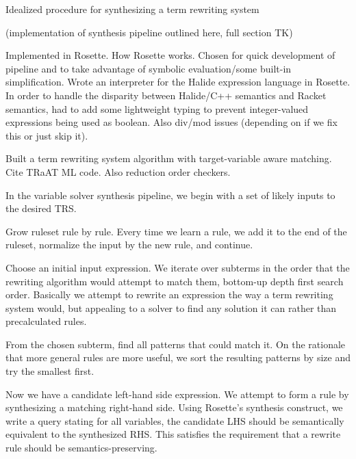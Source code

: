 \begin{algorithm}[H]
\SetAlgoLined
{}
\caption{Idealized procedure for synthesizing a term rewriting system}
\label{algo:synthesis}
\end{algorithm}

(implementation of synthesis pipeline outlined here, full section TK)

Implemented in Rosette. How Rosette works. Chosen for quick development of pipeline and to take advantage of symbolic evaluation/some built-in simplification. Wrote an interpreter for the Halide expression language in Rosette. In order to handle the disparity between Halide/C++ semantics and Racket semantics, had to add some lightweight typing to prevent integer-valued expressions being used as boolean. Also div/mod issues (depending on if we fix this or just skip it).

Built a term rewriting system algorithm with target-variable aware matching. Cite TRaAT ML code. Also reduction order checkers.

In the variable solver synthesis pipeline, we begin with a set of likely inputs to the desired TRS. 

Grow ruleset rule by rule. Every time we learn a rule, we add it to the end of the ruleset, normalize the input by the new rule, and continue.

Choose an initial input expression. We iterate over subterms in the order that the rewriting algorithm would attempt to match them, bottom-up depth first search order. Basically we attempt to rewrite an expression the way a term rewriting system would, but appealing to a solver to find any solution it can rather than precalculated rules.

From the chosen subterm, find all patterns that could match it. On the rationale that more general rules are more useful, we sort the resulting patterns by size and try the smallest first.

Now we have a candidate left-hand side expression. We attempt to form a rule by synthesizing a matching right-hand side. Using Rosette's synthesis construct, we write a query stating for all variables, the candidate LHS should be semantically equivalent to the synthesized RHS. This satisfies the requirement that a rewrite rule should be semantics-preserving.

